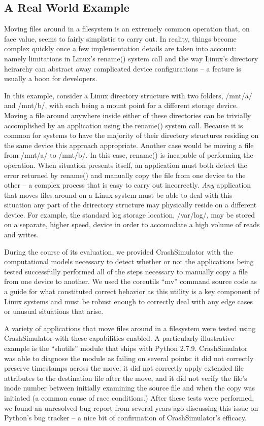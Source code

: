     \subsection{A Real World Example}

    Moving files around in a filesystem is an extremely common operation that, on face value, seems to fairly simplistic
    to carry out.  In reality, things become complex quickly once a few implementation details are taken into account:
    namely limitations in Linux's rename() system call and the way Linux's directory heirarchy can abstract away
    complicated device configurations -- a feature is usually a boon for developers.

    In this example, consider a Linux directory structure with two folders, /mnt/a/ and /mnt/b/, with each being a mount
    point for a different storage device.  Moving a file around anywhere inside either of these directories can be
    trivially accomplished by an application using the rename() system call.  Because it is common for systems to have
    the majority of their directory structures residing on the same device this approach appropriate.  Another case
    would be moving a file from /mnt/a/ to /mnt/b/.  In this case, rename() is incapable of performing the operation.
    When situation presents itself, an application must both detect the error returned by rename() and manually copy the
    file from one device to the other -- a complex process that is easy to carry out incorrectly.  \emph{Any}
    application that moves files around on a Linux system must be able to deal with this situation any part of the
    drirectory structure may physically reside on a different device.  For example, the standard log storage location,
    /var/log/, may be stored on a separate, higher speed, device in order to accomodate a high volume of reads and writes.

    During the course of its evaluation, we provided CrashSimulator with the computational models necessary to detect
    whether or not the applications being tested successfully performed all of the steps necessary to manually copy a
    file from one device to another.  We used the coreutils ``mv'' command source code as a guide for what constituted
    correct behavior as this utility is a key component of Linux systems and must be robust enough to correctly deal
    with any edge cases or unusual situations that arise.

    A variety of applications that move files around in a filesystem were tested using CrashSimulator with these
    capabilities enabled.  A particularly illustrative example is the ``shutils'' module that ships with Python 2.7.9.
    CrashSimulator was able to diagnose the module as failing on several points: it did not correctly preserve
    timestamps across the move, it did not correctly apply extended file attributes to the destination file after the
    move, and it did not verify the file's inode number between initially examining the source file and when the copy
    was initiated (a common cause of race conditions.)  After these tests were performed, we found an unresolved bug
    report from several years ago discussing this issue on Python's bug tracker -- a nice bit of confirmation of
    CrashSimulator's efficacy.

